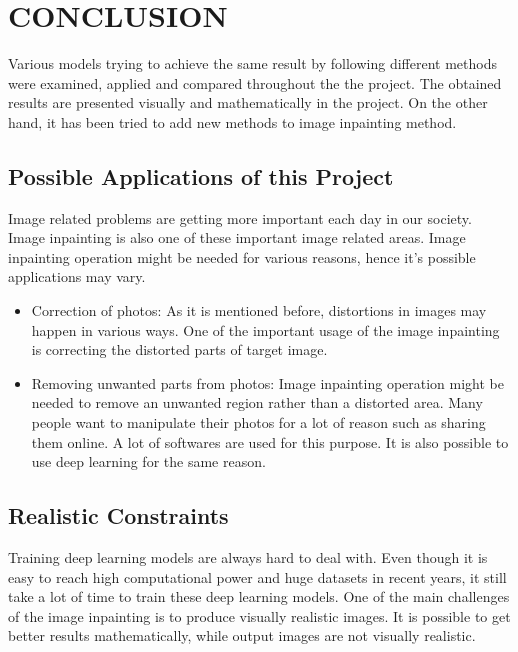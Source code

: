 \chapter{CONCLUSION}\label{conclution}

Various models trying to achieve the same result by following different methods were examined, applied and compared throughout the the project. The obtained results are presented visually and mathematically in the project. On the other hand, it has been tried to add new methods to image inpainting method.

\section{Possible Applications of this Project}

Image related problems are getting more important each day in our society. Image inpainting is also one of these important image related areas. Image inpainting operation might be needed for various reasons, hence it's possible applications may vary.

\begin{itemize}
  \item Correction of photos: As it is mentioned before, distortions in images may happen in various ways. One of the important usage of the image inpainting is correcting the distorted parts of target image. 
  \item Removing unwanted parts from photos: Image inpainting operation might be needed to remove an unwanted region rather than a distorted area. Many people want to manipulate their photos for a lot of reason such as sharing them online. A lot of softwares are used for this purpose. It is also possible to use deep learning for the same reason.
\end{itemize}

\section{Realistic Constraints}

Training deep learning models are always hard to deal with. Even though it is easy to reach high computational power and huge datasets in recent years, it still take a lot of time to train these deep learning models. One of the main challenges of the image inpainting is to produce visually realistic images. It is possible to get better results mathematically, while output images are not visually realistic.

